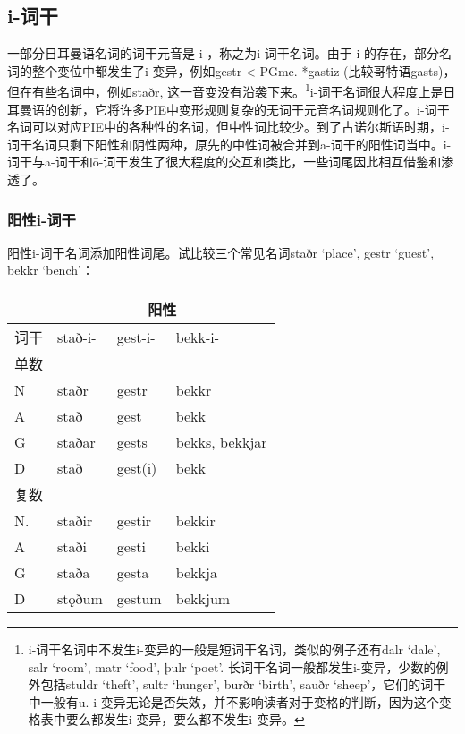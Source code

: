 \subsection{i-词干}
\label{i-词干}

一部分日耳曼语名词的词干元音是-i-，称之为i-词干名词。由于-i-的存在，部分名词的整个变位中都发生了i-变异，例如gestr
< PGmc. *gastiz (比较哥特语gasts)，但在有些名词中，例如staðr,
这一音变没有沿袭下来。\footnote{i-词干名词中不发生i-变异的一般是短词干名词，类似的例子还有dalr
  `dale', salr `room', matr `food', þulr
  `poet'. 长词干名词一般都发生i-变异，少数的例外包括stuldr `theft', sultr
  `hunger', burðr `birth', sauðr `sheep'，它们的词干中一般有u.
  i-变异无论是否失效，并不影响读者对于变格的判断，因为这个变格表中要么都发生i-变异，要么都不发生i-变异。}i-词干名词很大程度上是日耳曼语的创新，它将许多PIE中变形规则复杂的无词干元音名词规则化了。i-词干名词可以对应PIE中的各种性的名词，但中性词比较少。到了古诺尔斯语时期，i-词干名词只剩下阳性和阴性两种，原先的中性词被合并到a-词干的阳性词当中。i-词干与a-词干和ō-词干发生了很大程度的交互和类比，一些词尾因此相互借鉴和渗透了。

\subsubsection{阳性i-词干}\label{阳性i-词干}

阳性i-词干名词添加阳性词尾。试比较三个常见名词staðr `place', gestr
`guest', bekkr `bench'：

\begin{longtable}{llll}
  \toprule
     & \multicolumn{3}{c}{\textbf{阳性}}                            \\
  \midrule
  \endhead
  \bottomrule
  \endfoot
  词干 & stað-i-                         & gest-i- & bekk-i-        \\
  单数 &                                 &         &                \\
  N  & staðr                           & gestr   & bekkr          \\
  A  & stað                            & gest    & bekk           \\
  G  & staðar                          & gests   & bekks, bekkjar \\
  D  & stað                            & gest(i) & bekk           \\
  复数 &                                 &         &                \\
  N. & staðir                          & gestir  & bekkir         \\
  A  & staði                           & gesti   & bekki          \\
  G  & staða                           & gesta   & bekkja         \\
  D  & stǫðum                          & gestum  & bekkjum        \\
\end{longtable}

